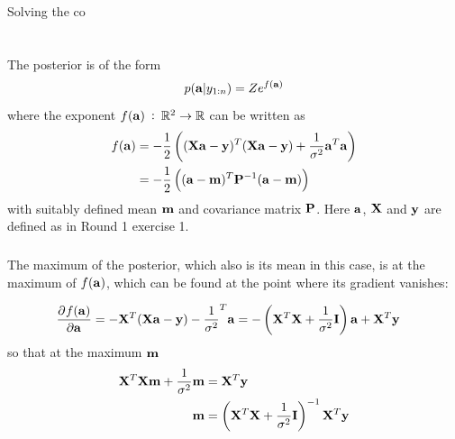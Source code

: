 \documentclass[a4paper,oneside,article]{memoir}
\begin{document}
\subsubsection{}

Solving the co


\section{}
\subsection{}
\subsubsection{}
The posterior is of the form
\[
p(\mathbf{a}|y_{1:n})=Ze^{f(\mathbf{a})}
\]
where the exponent $f(\mathbf{a})\::\:\mathbb{R}^2\to\mathbb{R}$ can be written as
\begin{align}
	f(\mathbf{a}) &= -\frac{1}{2}\left((\mathbf{Xa}-\mathbf{y})^T(\mathbf{Xa}-\mathbf{y})+\frac{1}{\sigma^2}\mathbf{a}^T\mathbf{a}\right)\\
	&= -\frac{1}{2}\left((\mathbf{a}-\mathbf{m})^T\mathbf{P}^{-1}(\mathbf{a}-\mathbf{m})\right)
\end{align}
with suitably defined mean $\mathbf{m}$ and covariance matrix $\mathbf{P}$. Here $\mathbf{a}$, $\mathbf{X}$ and $\mathbf{y}$ are defined
as in Round 1 exercise 1.


\subsubsection{}
The maximum of the posterior, which also is its mean in this case, is at the maximum of $f(\mathbf{a})$, which can be found 
at the point where its gradient vanishes:

\begin{align}
	\dpd{f(\v{a})}{\v{a}} &= -\v{X}^T(\v{Xa}-\v{y})-\frac{1}{\sigma^2}^T\v{a} = -\left(\v{X}^T\v{X}+\frac{1}{\sigma^2}\v{I}\right)\v{a} + \v{X}^T\v{y}
\end{align}
so that at the maximum $\mathbf{m}$
\begin{align}
	\mathbf{X}^T\mathbf{X}\mathbf{m}+\frac{1}{\sigma^2}\mathbf{m} &= \mathbf{X}^T\mathbf{y} \\
	\mathbf{m} &= \left(\mathbf{X}^T\mathbf{X}+\frac{1}{\sigma^2}\mathbf{I}\right)^{-1}\mathbf{X}^T\mathbf{y} \\
\end{align}

\subsubsection{}
\end{document}

